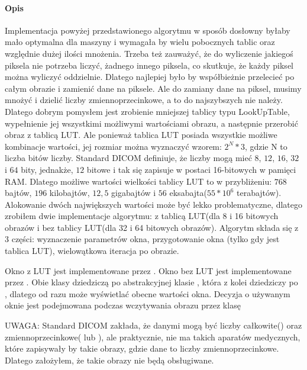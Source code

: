 \paragraph{Opis}
\par
Implementacja powyżej przedstawionego algorytmu w sposób dosłowny byłaby mało optymalna dla maszyny i wymagała by wielu pobocznych tablic oraz względnie dużej ilości mnożenia.
Trzeba też zauważyć, że do wyliczenie jakiegoś piksela nie potrzeba liczyć, żadnego innego piksela, co skutkuje, że każdy piksel można wyliczyć oddzielnie.
Dlatego najlepiej było by współbieżnie przelecieć po całym obrazie i zamienić dane na piksele.
Ale do zamiany dane na piksel, musimy mnożyć i dzielić liczby zmiennoprzecinkowe, a to do najszybszych nie należy.
Dlatego dobrym pomysłem jest zrobienie mniejszej tablicy typu LookUpTable, wypełnienie jej wszystkimi możliwymi wartościami obrazu, a następnie przerobić obraz z tablicą LUT.
Ale ponieważ tablica LUT posiada wszystkie możliwe kombinacje wartości, jej rozmiar można wyznaczyć wzorem: $2^N*3$, gdzie N to liczba bitów liczby.
Standard DICOM definiuje, że liczby mogą mieć $8$, $12$, $16$, $32$ i $64$ bity, jednakże, $12$ bitowe i tak się zapisuje w postaci 16-bitowych w pamięci RAM.
Dlatego możliwe wartości wielkości tablicy LUT to w przybliżeniu: $768$ bajtów, $196$ kilobajtów, $12,5$ gigabajtów i $56$ eksabajta($55*10^{6}$ terabajtów).
Alokowanie dwóch największych wartości może być lekko problematyczne, dlatego zrobiłem dwie implementacje algorytmu: z tablicą LUT(dla 8 i 16 bitowych obrazów i bez tablicy LUT(dla 32 i 64 bitowych obrazów).
Algorytm składa się z 3 części: wyznaczenie parametrów okna, przygotowanie okna (tylko gdy jest tablica LUT), wielowątkowa iteracja po obrazie.
\par
Okno z LUT jest implementowane przez .
Okno bez LUT jest implementowane przez .
Obie klasy dziedziczą po abstrakcyjnej klasie , która z kolei dziedziczy po , dlatego od razu może wyświetlać obecne wartości okna.
Decyzja o używanym oknie jest podejmowana podczas wczytywania obrazu przez klasę 
\par
UWAGA: Standard DICOM zakłada, że danymi mogą być liczby całkowite() oraz zmiennoprzecinkowe( lub ), ale praktycznie, nie ma takich aparatów medycznych, które zapisywały by takie obrazy, gdzie dane to liczby zmiennoprzecinkowe. Dlatego założyłem, że takie obrazy nie będą obsługiwane.

